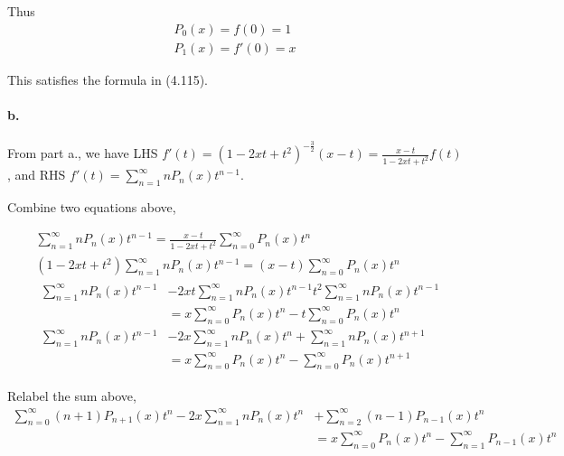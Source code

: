 \documentclass{article}
\begin{document}
Thus
\begin{equation}
  \begin{split}
    P_{0}(x) = f(0) = 1 \\
    P_{1}(x) = f'(0) = x
  \end{split}
\end{equation}

This satisfies the formula in (4.115).

\paragraph{b.}
From part a., we have LHS $  f'(t) = (1-2xt+t^2)^{-\frac{3}{2}}(x-t) = \frac{x-t}{1-2xt+t^2} f(t)$,
and RHS $ f'(t) = \sum_{n=1}^{\infty} n P_{n}(x) t^{n-1}$.

Combine two equations above,

\begin{equation}
  \begin{split}
    &\sum_{n=1}^{\infty} n P_{n}(x) t^{n-1} =  \frac{x-t}{1-2xt+t^2} \sum_{n=0}^{\infty} P_{n}(x) t^{n} \\
    &(1-2xt+t^2)\sum_{n=1}^{\infty} n P_{n}(x) t^{n-1} =  (x-t) \sum_{n=0}^{\infty} P_{n}(x) t^{n} \\
    &\begin{split}
      \sum_{n=1}^{\infty} n P_{n}(x) t^{n-1} &- 2xt \sum_{n=1}^{\infty} n P_{n}(x) t^{n-1} t^2 \sum_{n=1}^{\infty} n P_{n}(x) t^{n-1} \\
      &= x \sum_{n=0}^{\infty} P_{n}(x) t^{n} -t \sum_{n=0}^{\infty} P_{n}(x) t^{n}\\
      \sum_{n=1}^{\infty} n P_{n}(x) t^{n-1} &- 2x \sum_{n=1}^{\infty} n P_{n}(x) t^{n} +  \sum_{n=1}^{\infty} n P_{n}(x) t^{n+1}  \\
      &= x \sum_{n=0}^{\infty} P_{n}(x) t^{n} -  \sum_{n=0}^{\infty} P_{n}(x) t^{n+1}
    \end{split}
  \end{split}
\end{equation}

Relabel the sum above,
\begin{equation}
  \begin{split}
    \sum_{n=0}^{\infty} (n+1) P_{n+1}(x) t^{n} - 2x \sum_{n=1}^{\infty} n P_{n}(x) t^{n} &+  \sum_{n=2}^{\infty} (n-1) P_{n-1}(x) t^{n} \\
    &= x \sum_{n=0}^{\infty} P_{n}(x) t^{n} -  \sum_{n=1}^{\infty} P_{n-1}(x) t^{n}
  \end{split}
\end{equation}
\end{document}
